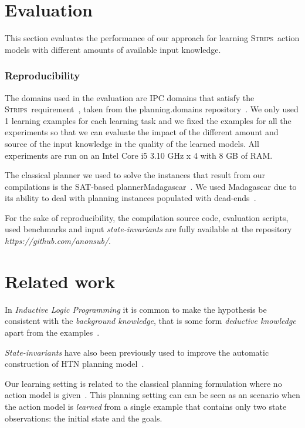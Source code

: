 \documentclass{article}
\newcommand{\strips}{\textsc{Strips}}
\begin{document}
\section{Evaluation}
\label{sec:evaluation}
This section evaluates the performance of our approach for learning \strips\ action models with different amounts of available input knowledge.

\subsubsection{Reproducibility}
The domains used in the evaluation are IPC domains that satisfy the \strips\ requirement~\cite{fox2003pddl2}, taken from the {\sc planning.domains} repository~\cite{muise2016planning}. We only used 1 learning examples for each learning task and we fixed the examples for all the experiments so that we can evaluate the impact of the different amount and source of the input knowledge in the quality of the learned models. All experiments are run on an Intel Core i5 3.10 GHz x 4 with 8 GB of RAM.

The classical planner we used to solve the instances that result from our compilations is the SAT-based planner{\sc Madagascar}~\cite{rintanen2014madagascar}. We used {\sc Madagascar} due to its ability to deal with planning instances populated with dead-ends~\cite{lopez2015deterministic}.

For the sake of reproducibility, the compilation source code, evaluation scripts, used benchmarks and input {\em state-invariants} are fully available at the repository {\em https://github.com/anonsub/}.


\section{Related work}
\label{sec:related}
In {\em Inductive Logic Programming} it is common to make the hypothesis be consistent with the {\em background knowledge}, that is some form {\em deductive knowledge} apart from the examples~\cite{muggleton1994inductive}.

{\em State-invariants} have also been previously used to improve the automatic construction of HTN planning model~\cite{lotinac2016constructing}.

Our learning setting is related to the classical planning formulation where no action model is given~\cite{SternJ17}. This planning setting can can be seen as an scenario when the action model is {\em learned} from a single example that contains only two state observations: the initial state and the goals.
\end{document}
